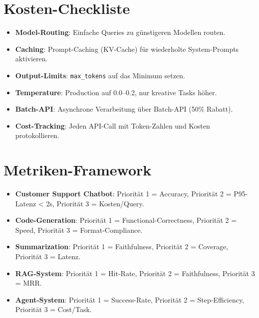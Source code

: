 \section{Kosten-Checkliste}

\begin{itemize}[leftmargin=*]
     \item \textbf{Model-Routing}\hspace{0pt}: Einfache Queries zu günstigeren Modellen routen.
     \item \textbf{Caching}\hspace{0pt}: Prompt-Caching (KV-Cache) für wiederholte System-Prompts aktivieren.
     \item \textbf{Output-Limits}\hspace{0pt}: \texttt{max\_tokens} auf das Minimum setzen.
     \item \textbf{Temperature}\hspace{0pt}: Production auf 0.0--0.2, nur kreative Tasks höher.
     \item \textbf{Batch-API}\hspace{0pt}: Asynchrone Verarbeitung über Batch-API (50\% Rabatt).
     \item \textbf{Cost-Tracking}\hspace{0pt}: Jeden API-Call mit Token-Zahlen und Kosten protokollieren.
\end{itemize}

\section{Metriken-Framework}

\begin{itemize}[leftmargin=*]
     \item \textbf{Customer Support Chatbot}\hspace{0pt}: Priorität 1 = Accuracy, Priorität 2 = P95-Latenz < 2s, Priorität 3 = Kosten/Query.
     \item \textbf{Code-Generation}\hspace{0pt}: Priorität 1 = Functional-Correctness, Priorität 2 = Speed, Priorität 3 = Format-Compliance.
     \item \textbf{Summarization}\hspace{0pt}: Priorität 1 = Faithfulness, Priorität 2 = Coverage, Priorität 3 = Latenz.
     \item \textbf{RAG-System}\hspace{0pt}: Priorität 1 = Hit-Rate, Priorität 2 = Faithfulness, Priorität 3 = MRR.
     \item \textbf{Agent-System}\hspace{0pt}: Priorität 1 = Success-Rate, Priorität 2 = Step-Efficiency, Priorität 3 = Cost/Task.
\end{itemize}

